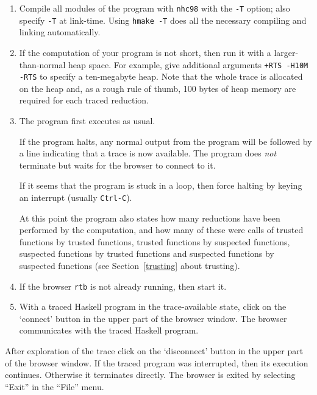\documentclass[12pt]{article}
\begin{document}
\begin{enumerate}
\item
Compile all modules of the program with \texttt{nhc98} with the \texttt{-T} option; also specify \texttt{-T} at link-time.  Using \texttt{hmake -T} does
all the necessary compiling and linking automatically.

\item
If the computation of your program is not short, then run it with a larger-than-normal heap space.
For example, give additional arguments \texttt{+RTS -H10M -RTS} to specify a ten-megabyte heap.
Note that the whole trace is allocated on the heap and, as a rough rule of thumb, 100 bytes of heap memory are required for each traced reduction.

\item
The program first executes as usual.

If the program halts, any normal output from the program will
be followed by a line indicating that a trace is
now available.  The program does \emph{not} terminate but waits
for the browser to connect to it.
   
If it seems that the program is stuck in a loop, then
force halting by keying an interrupt
(usually \texttt{Ctrl-C}).

At this point the program also states how many reductions have been performed by the computation, and how many of these were calls of trusted functions by trusted functions, trusted functions by suspected functions, suspected functions by trusted functions and suspected functions by suspected functions (see Section~\ref{trusting} about trusting).

\item
If the browser \texttt{rtb} is not already running, then start it.

\item
With a traced Haskell program in the trace-available
state, click on the `connect' button in the upper part
of the browser window.  
The browser communicates with the traced Haskell program.
\end{enumerate}

After exploration of the trace click on the `disconnect' button in the upper part of the browser window. If the traced program was interrupted, then its execution continues. Otherwise it terminates directly.
The browser is exited by selecting ``Exit'' in the ``File'' menu.

\end{document}
